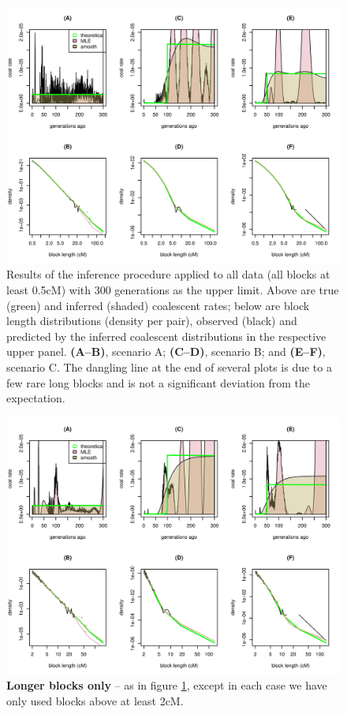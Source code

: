 \documentclass{article}
\begin{document}
\begin{figure}[htp!]
\begin{center}
\includegraphics{full-inversions}
\caption{
\label{fig:full_inversions}
Results of the inference procedure applied to all data (all blocks at least 0.5cM) with 300 generations as the upper limit.
Above are true (green) and inferred (shaded) coalescent rates;
below are block length distributions (density per pair), observed (black) and predicted by the inferred coalescent distributions in the respective upper panel.
{\bf (A--B)}, scenario A;
{\bf (C--D)}, scenario B; and
{\bf (E--F)}, scenario C.
The dangling line at the end of several plots is due to a few rare long blocks
and is not a significant deviation from the expectation.
}
\end{center}
\end{figure}

\begin{figure}[htp!]
\begin{center}
\includegraphics{long-inversions}
\caption{
\label{fig:long_inversions}
{\bf Longer blocks only} -- as in figure \ref{fig:full_inversions}, except in each case we have only used blocks above at least 2cM.
}
\end{center}
\end{figure}
\end{document}
